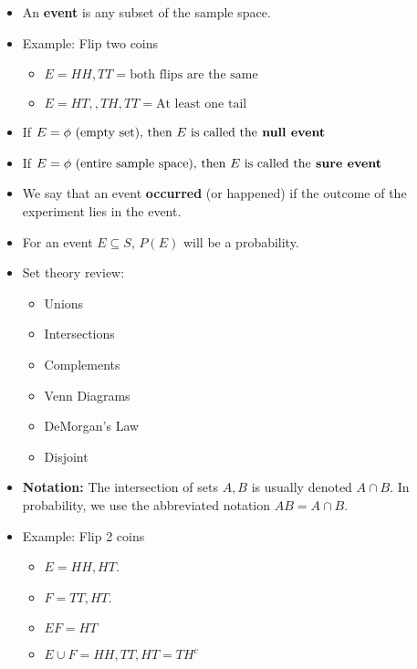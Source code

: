 \documentclass[10pt]{article}
\begin{document}
\begin{itemize}
    \item An \textbf{event} is any subset of the sample space.
    \item Example: Flip two coins
        \begin{itemize}
            \item $E = {HH, TT} = \text{both flips are the same}$
            \item $E = {HT, ,TH, TT} = \text{At least one tail}$
        \end{itemize}
    \item If $E = \phi \text{ (empty set), then } E \text{ is called
        the\textbf{ null event}}$
    \item If $E = \phi \text{ (entire sample space), then } E \text{ is called
        the\textbf{ sure event}}$
    \item We say that an event \textbf{occurred} (or happened) if the outcome of
        the experiment lies in the event.
    \item For an event $E \subseteq S$, $P(E)$ will be a probability.
    \item Set theory review:
        \begin{itemize}
            \item Unions
            \item Intersections
            \item Complements
            \item Venn Diagrams
            \item DeMorgan's Law
            \item Disjoint
        \end{itemize}
    \item \textbf{Notation:} The intersection of sets $A, B$ is usually denoted
        $A \cap B$. In probability, we use the abbreviated notation $AB = A \cap
        B$.
    \item Example: Flip 2 coins
        \begin{itemize}
            \item $E = {HH, HT}$.
            \item $F = {TT, HT}$.
            \item $EF = {HT}$
            \item $E \cup F = {HH, TT, HT} = {TH}^c$

\end{itemize}
\end{itemize}
\end{document}
